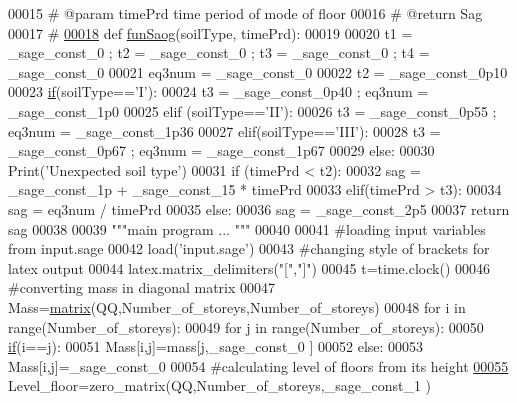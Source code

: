 \begin{DoxyCode}
00015 \textcolor{comment}{# @param timePrd time period of mode of floor }
00016 \textcolor{comment}{# @return Sag }
00017 \textcolor{comment}{#}
\hypertarget{main_8sage_8py_source_l00018}{}\hyperlink{namespacemain_a4f60afd2426ee9409955e4352b3f0486}{00018} \textcolor{keyword}{def }\hyperlink{namespacemain_a4f60afd2426ee9409955e4352b3f0486}{funSaog}(soilType, timePrd):
00019 
00020   t1 = \_sage\_const\_0 ; t2 = \_sage\_const\_0 ; t3 = \_sage\_const\_0 ; t4 = \_sage\_const\_0 
00021   eq3num = \_sage\_const\_0 
00022   t2 = \_sage\_const\_0p10 
00023   \hyperlink{bootstrap_8min_8js_ac2d69f5011896c6ed4a54e0dd36f6334}{if}(soilType==\textcolor{stringliteral}{'I'}):
00024       t3 = \_sage\_const\_0p40 ; eq3num = \_sage\_const\_1p0 
00025   \textcolor{keywordflow}{elif} (soilType==\textcolor{stringliteral}{'II'}):
00026       t3 = \_sage\_const\_0p55 ; eq3num = \_sage\_const\_1p36 
00027   elif(soilType==\textcolor{stringliteral}{'III'}):
00028       t3 = \_sage\_const\_0p67 ; eq3num = \_sage\_const\_1p67 
00029   \textcolor{keywordflow}{else}:
00030       Print(\textcolor{stringliteral}{'Unexpected soil type'})
00031   \textcolor{keywordflow}{if} (timePrd < t2):
00032       sag = \_sage\_const\_1p  + \_sage\_const\_15  * timePrd
00033   elif(timePrd > t3):
00034       sag = eq3num / timePrd
00035   \textcolor{keywordflow}{else}:
00036       sag = \_sage\_const\_2p5 
00037   \textcolor{keywordflow}{return} sag
00038 
00039 \textcolor{stringliteral}{"""main program ... """}
00040 
00041 \textcolor{comment}{#loading input variables from input.sage}
00042 load(\textcolor{stringliteral}{'input.sage'})
00043 \textcolor{comment}{#changing style of brackets for latex output}
00044 latex.matrix\_delimiters(\textcolor{stringliteral}{"["},\textcolor{stringliteral}{"]"})
00045 t=time.clock()
00046 \textcolor{comment}{#converting mass in diagonal matrix}
00047 Mass=\hyperlink{namespacecivilsage_1_1views_a8b58c93a9c82e84143c43dafaa744a4b}{matrix}(QQ,Number\_of\_storeys,Number\_of\_storeys)
00048 \textcolor{keywordflow}{for} i \textcolor{keywordflow}{in} range(Number\_of\_storeys):
00049     \textcolor{keywordflow}{for} j \textcolor{keywordflow}{in} range(Number\_of\_storeys):
00050         \hyperlink{bootstrap_8min_8js_ac2d69f5011896c6ed4a54e0dd36f6334}{if}(i==j):
00051             Mass[i,j]=mass[j,\_sage\_const\_0 ]
00052         \textcolor{keywordflow}{else}:
00053             Mass[i,j]=\_sage\_const\_0 
00054 \textcolor{comment}{#calculating level of floors from its height}
\hypertarget{main_8sage_8py_source_l00055}{}\hyperlink{namespacemain_ad7b051da0e829aff37fef1e171e37fa3}{00055} Level\_floor=zero\_matrix(QQ,Number\_of\_storeys,\_sage\_const\_1 )

\end{DoxyCode}
